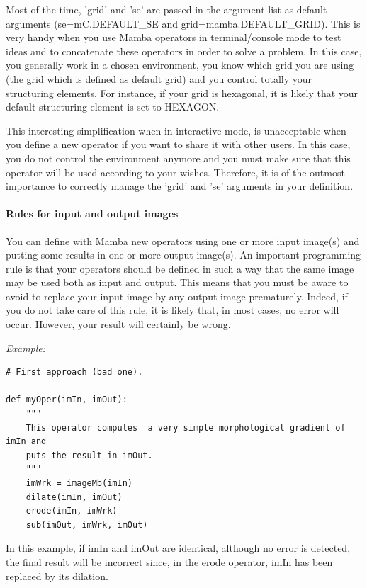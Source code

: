 \documentclass[a4paper,10pt,oneside]{article}
\begin{document}
Most of the time, 'grid' and 'se' are passed in the argument list as default 
arguments (se=mC.DEFAULT\_SE and grid=mamba.DEFAULT\_GRID). This is very handy 
when you use Mamba operators in terminal/console mode to test ideas and to 
concatenate these operators in order to solve a problem. In this case, you 
generally work in a chosen environment, you know which grid you are using (the 
grid which is defined as default grid) and you control totally your structuring 
elements. For instance, if your grid is hexagonal, it is likely that your 
default structuring element is set to HEXAGON.

This interesting simplification when in interactive mode, is unacceptable when 
you define a new operator if you want to share it with other users. In this 
case, you do not control the environment anymore and you must make sure that 
this operator will be used according to your wishes. Therefore, it is of the 
outmost importance to correctly manage the 'grid' and 'se' arguments in your 
definition. 
 
\paragraph{Rules for input and output images}

You can define with Mamba new operators using one or more input image(s) and 
putting some results in one or more output image(s). An important programming 
rule is that your operators should be defined in such a way that the same image 
may be used both as input and output. This means that you must be aware to 
avoid to replace your input image by any output image prematurely. Indeed, if 
you do not take care of this rule, it is likely that, in most cases, no error 
will occur. However, your result will certainly be wrong.\par

\emph{Example:}

\lstset{language=Python}
\begin{lstlisting}
# First approach (bad one).

def myOper(imIn, imOut):
    """
    This operator computes  a very simple morphological gradient of imIn and
    puts the result in imOut.
    """
    imWrk = imageMb(imIn)
    dilate(imIn, imOut)
    erode(imIn, imWrk)
    sub(imOut, imWrk, imOut)
\end{lstlisting}

In this example, if imIn and imOut are identical, although no error is detected, 
the final result will be incorrect since, in the erode operator, imIn has been 
replaced by its dilation.
\end{document}
